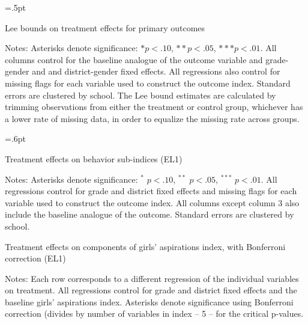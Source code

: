 \documentclass[letterpaper,12pt,pdftex]{article}
\begin{document}
\clearpage
\newpage

\begin{table}
\tabcolsep=.5pt
\caption{Lee bounds on treatment effects for primary outcomes}
\label{tab_lee_bounds_combined}
\footnotesize

\vspace{0.5cm}
\flushleft \footnotesize {Notes: Asterisks denote significance: $* p < .10$, $** p < .05$, $*** p < .01$. All columns control for the baseline analogue of the outcome variable and grade-gender and and district-gender fixed effects. All regressions also control for missing flags for each variable used to construct the outcome index. Standard errors are clustered by school. The Lee bound estimates are calculated by trimming observations from either the treatment or control group, whichever has a lower rate of missing data, in order to equalize the missing rate across groups.}
\end{table}
\restoregeometry

\clearpage
\newpage

\begin{table}
\tabcolsep=.6pt
		\caption{Treatment effects on behavior sub-indices (EL1)}
		\label{tab_beh_si_el1}
		\vspace{.4cm}
		\begin{center}
			\small
			
		\end{center}
\flushleft \footnotesize {Notes: Asterisks denote significance: $^*$ $p < .10$, $^{**}$ $p < .05$, $^{***}$ $p < .01$. All regressions control for grade and district fixed effects and missing flags for each variable used to construct the outcome index. All columns except column 3 also include the baseline analogue of the outcome. Standard errors are clustered by school.}
\end{table}
\restoregeometry

\clearpage
\newpage

\begin{table}
	\tabcolsep=12pt
	\caption{Treatment effects on components of girls' aspirations index, with Bonferroni correction (EL1)}
	\label{tab_aspatt_ivars_el1}
	\begin{center}
		\small{}
	\end{center}
	\flushleft \footnotesize {Notes: Each row corresponds to a different regression of the individual variables on treatment. All regressions control for grade and district fixed effects and the baseline girls' aspirations index. Asterisks denote significance using Bonferroni correction (divides by number of variables in index -- 5 -- for the critical p-values.}
\end{table}
\end{document}
